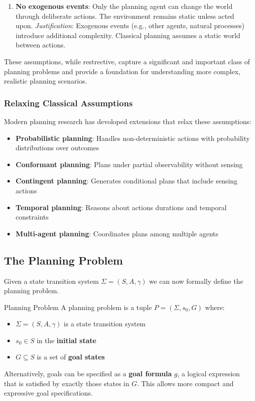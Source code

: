 \documentclass[a4paper]{article}
\theoremstyle{definition}
\begin{document}
\begin{enumerate}
        \newline
        \textit{Justification}: Ignoring action durations simplifies the planning model. Temporal planning
        extends classical planning to handle durations and concurrent actions.
    \item \textbf{No exogenous events}: Only the planning agent can change the world through deliberate actions. 
        The environment remains static unless acted upon.
        \vspace{1em}
        \noindent
        \newline
        \textit{Justification}: Exogenous events (e.g., other agents, natural processes) introduce additional complexity.
        Classical planning assumes a static world between actions.
\end{enumerate}
These assumptions, while restrective, capture a significant and important class of planning problems and provide a foundation
for understanding more complex, realistic planning scenarios.
\subsubsection{Relaxing Classical Assumptions}
Modern planning research has devoloped extensions that relax these assumptions:
\begin{itemize}
    \item \textbf{Probabilistic planning}: Handles non-deterministic actions with probability 
        distributions over outcomes
    \item \textbf{Conformant planning}: Plans under partial observability without sensing 
    \item \textbf{Contingent planning}: Generates conditional plans that include sensing actions 
    \item \textbf{Temporal planning}: Reasons about actions durations and temporal constraints
    \item \textbf{Multi-agent planning}: Coordinates plans among multiple agents
\end{itemize}
\subsection{The Planning Problem}
Given a state transition system \( \Sigma = (S,A,\gamma) \) we can now formally define
the planning problem.
\begin{definition}{Planning Problem}
A planning problem is a tuple \( P = (\Sigma, s_0, G) \) where:
\begin{itemize}
    \item \( \Sigma = (S,A,\gamma) \) is a state transition system
    \item \( s_0 \in S \) in the \textbf{initial state}
    \item \( G \subseteq S \) is a set of \textbf{goal states}
\end{itemize}
\end{definition}
Alternatively, goals can be specified as a \textbf{goal formula} \( g \), a logical 
expression that is satisfied by exactly those states in \( G \). This allows more compact and expressive goal 
specifications.
\end{document}
